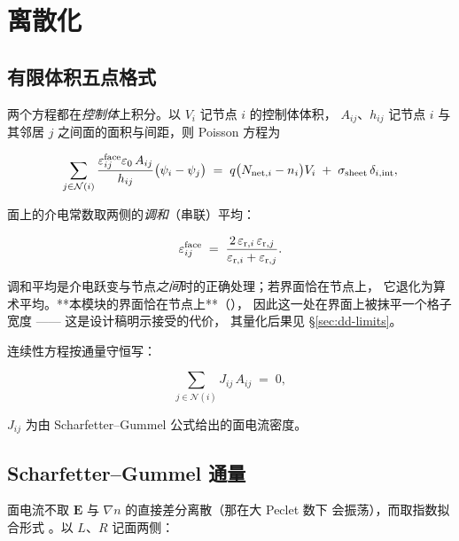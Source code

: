 \section{离散化}
\label{sec:dd-discretisation}

\subsection{有限体积五点格式}
\label{sec:dd-fv}

两个方程都在\emph{控制体}上积分。以 $V_i$ 记节点 $i$ 的控制体体积，
$A_{ij}$、$h_{ij}$ 记节点 $i$ 与其邻居 $j$ 之间面的面积与间距，则
Poisson 方程为

\begin{equation}
\sum_{j\in\mathcal{N}(i)}
\frac{\varepsilon^{\mathrm{face}}_{ij}\varepsilon_{0}\,A_{ij}}{h_{ij}}
\bigl(\psi_i-\psi_j\bigr)
\;=\;
q\bigl(N_{\text{net},i}-n_i\bigr)V_i \;+\; \sigma_{\text{sheet}}\,\delta_{i,\text{int}},
\label{eq:dd-poisson-fv}
\end{equation}

面上的介电常数取两侧的\emph{调和}（串联）平均：

\begin{equation}
\varepsilon^{\mathrm{face}}_{ij} \;=\; \frac{2\,\varepsilon_{\mathrm{r},i}\,\varepsilon_{\mathrm{r},j}}{\varepsilon_{\mathrm{r},i}+\varepsilon_{\mathrm{r},j}}.
\label{eq:dd-harmonic}
\end{equation}

调和平均是介电跃变与节点\emph{之间}时的正确处理；若界面恰在节点上，
它退化为算术平均。**本模块的界面恰在节点上**（），
因此这一处在界面上被抹平一个格子宽度 —— 这是设计稿明示接受的代价，
其量化后果见 \S\ref{sec:dd-limits}。

连续性方程按通量守恒写：

\begin{equation}
\sum_{j\in\mathcal{N}(i)} J_{ij}\,A_{ij} \;=\; 0,
\label{eq:dd-continuity-fv}
\end{equation}

$J_{ij}$ 为由 Scharfetter--Gummel 公式给出的面电流密度。

\subsection{Scharfetter--Gummel 通量}
\label{sec:dd-sg}

面电流不取 $\mathbf{E}$ 与 $\nabla n$ 的直接差分离散（那在大 Peclet 数下
会振荡），而取指数拟合形式 \cite{scharfetter1969}。以 $L$、$R$ 记面两侧：


